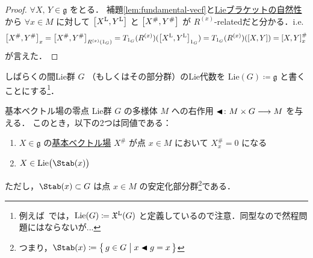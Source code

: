 \documentclass[TQFT_main]{subfiles}
\begin{document}
\begin{proof}
    $\forall X,\, Y \in \mathfrak{g}$ をとる．
    補題\ref{lem:fundamental-vecf}と\hyperref[prop:Lie-bracket-natural]{Lieブラケットの自然性}から $\forall x \in M$ に対して $\comm{\Lie{X}}{\Lie{Y}}$ と $\comm{X^\#}{Y^\#}$ が $R^{(x)}$-relatedだと分かる．i.e.
    \begin{align}
        \comm{X^\#}{Y^\#}_x = \comm{X^\#}{Y^\#}_{R^{(x)}(1_G)} = T_{1_G} (R^{(x)}) (\comm{\Lie{X}}{\Lie{Y}}_{1_G}) = T_{1_G} (R^{(x)}) (\comm{X}{Y}) = \comm{X}{Y}^\#_x
    \end{align}
    が言えた．
\end{proof}

しばらくの間Lie群 $G$ （もしくはその部分群）のLie代数を $\mathrm{Lie}(G) \coloneqq \mathfrak{g}$ と書くことにする\footnote{例えば~\cite{Lee2012smooth}では，$\mathrm{Lie}(G) \coloneqq \mathfrak{X}^{\mathrm{L}}(G)$ と定義しているので注意．同型なので然程問題にはならないが...}．

\begin{myprop}[label=prop:fundamental-vecf-basic]{基本ベクトル場の零点}
    Lie群 $G$ の\cinfty 多様体 $M$ への右作用 $\blacktriangleleft \colon M \times G \longrightarrow M$ を与える．
    このとき，以下の2つは同値である：
    \begin{enumerate}
        \item $X \in \mathfrak{g}$ の\hyperref[def:fundamental-vecf]{基本ベクトル場} $X^\#$ が点 $x \in M$ において $X^\#_x = 0$ になる
        \item $X \in \mathrm{Lie}\bigl(\Stab (x)\bigr)$
    \end{enumerate}
    ただし，$\Stab (x) \subset G$ は点 $x \in M$ の安定化部分群\footnote{つまり，$\Stab (x) \coloneqq \bigl\{\, g \in G \bigm| x \btl g = x \,\bigr\}$ }である．
\end{myprop}
\end{document}
